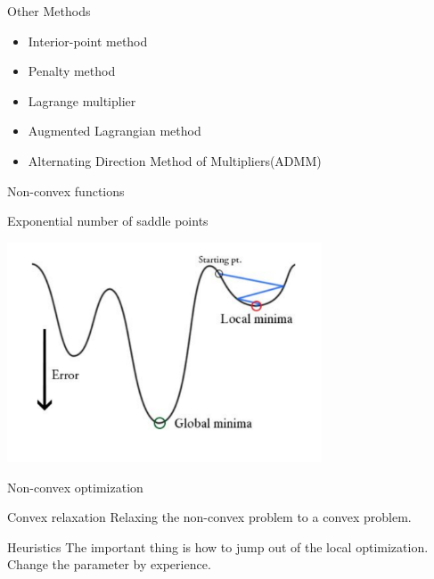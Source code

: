     \begin{frame}{Other Methods}
      \Large
      \begin{spacing}{1.5}
        \begin{itemize}
          \item Interior-point method
          \item Penalty method
          \item Lagrange multiplier
          \item Augmented Lagrangian method
          \item Alternating Direction Method of Multipliers(ADMM)
        \end{itemize}
      \end{spacing}
    \end{frame}

    \begin{frame}{Non-convex functions}
      \begin{block}
        {Exponential number of saddle points}
      \end{block}
      \centering
      \includegraphics[width = 0.7\textwidth]{images/Non-convex1.png}
    \end{frame}

    \begin{frame}{Non-convex optimization}
      \begin{block}{Convex relaxation}
        Relaxing the non-convex problem to a convex problem.

      \end{block}
      \vspace{15pt}

      \begin{block}{Heuristics}
        The important thing is how to jump out of the local optimization.\\
        Change the parameter by experience.
      \end{block}

    \end{frame}

